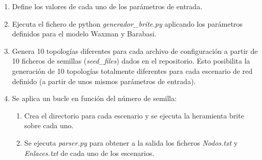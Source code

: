 \begin{enumerate}
    \item Define los valores de cada uno de los parámetros de entrada.
    \item Ejecuta el fichero de python \textit{generador\_brite.py} aplicando los parámetros definidos para el modelo Waxman y Barabasi.
    \item Genera 10 topologías diferentes para cada archivo de configuración a partir de 10 ficheros de semillas (\textit{seed\_files}) dados en el repositorio. Esto posibilita la generación de 10 topologías totalmente diferentes para cada escenario de red definido (a partir de unos mismos parámetros de entrada). 
    \item Se aplica un bucle en función del número de semilla:
    \begin{enumerate} 
        \item Crea el directorio para cada escenario y se ejecuta la heramienta \gls{brite} sobre cada uno.
        \item Se ejecuta \textit{parser.py} para obtener a la salida los ficheros \textit{Nodos.txt} y \textit{Enlaces.txt} de cada uno de los escenarios.   
    \end{enumerate} 
\end{enumerate}

